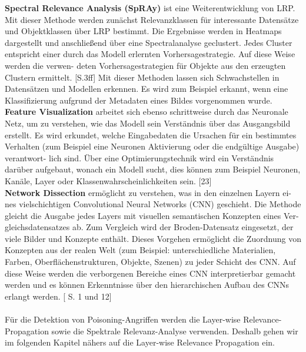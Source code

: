 \documentclass[11pt,a4paper]{article}
\numberwithin{equation}{section}
\begin{document}
	\noindent \textbf{Spectral Relevance Analysis (SpRAy)} ist eine Weiterentwicklung von LRP. Mit
	dieser Methode werden zunächst Relevanzklassen für interessante Datensätze und
	Objektklassen über LRP bestimmt. Die Ergebnisse werden in Heatmaps dargestellt
	und anschließend über eine Spectralanalyse geclustert. Jedes Cluster entspricht einer
	durch das Modell erlernten Vorhersagestrategie. Auf diese Weise werden die verwen-
	deten Vorhersagestrategien für Objekte aus den erzeugten Clustern ermittelt. \cite{unmaskingCH}[S.3ff] Mit dieser Methoden lassen sich Schwachstellen in Datensätzen und Modellen erkennen. Es wird zum Beispiel erkannt, wenn eine Klassifizierung aufgrund der
	Metadaten eines Bildes vorgenommen wurde.\\
	
	\noindent \textbf{Feature Visualization} arbeitet sich ebenso schrittweise durch das Neuronale Netz,
	um zu verstehen, wie das Modell sein Verständnis über das Ausgangsbild erstellt.
	Es wird erkundet, welche Eingabedaten die Ursachen für ein bestimmtes Verhalten
	(zum Beispiel eine Neuronen Aktivierung oder die endgültige Ausgabe) verantwort-
	lich sind. Über eine Optimierungstechnik wird ein Verständnis darüber aufgebaut,
	wonach ein Modell sucht, dies können zum Beispiel Neuronen, Kanäle, Layer oder
	Klassenwahrscheinlichkeiten sein. [23]\\
	
	
	\noindent \textbf{Network Dissection} ermöglicht zu verstehen, was in den einzelnen Layern ei-
	nes vielschichtigen Convolutional Neural Networks (CNN) geschieht. Die Methode
	gleicht die Ausgabe jedes Layers mit visuellen semantischen Konzepten eines Ver-
	gleichsdatensatzes ab. Zum Vergleich wird der Broden-Datensatz eingesetzt, der
	viele Bilder und Konzepte enthält. Dieses Vorgehen ermöglicht die Zuordnung von
	Konzepten aus der realen Welt (zum Beispiel: unterschiedliche Materialien, Farben,
	Oberflächenstrukturen, Objekte, Szenen) zu jeder Schicht des CNN. Auf diese Weise
	werden die verborgenen Bereiche eines CNN interpretierbar gemacht werden und es
	können Erkenntnisse über den hierarchischen Aufbau des CNNs erlangt werden. \cite{networkdissection}[
	S. 1 und 12]\\
	\\
	Für die Detektion von Poisoning-Angriffen werden die Layer-wise Relevance-Propagation sowie die Spektrale Relevanz-Analyse verwenden. Deshalb gehen wir im folgenden Kapitel nähers auf die Layer-wise Relevance Propagation ein.
	
\end{document}
